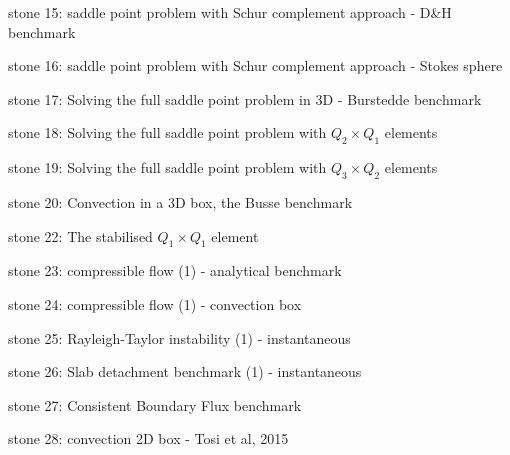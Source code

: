 {\noindent stone 15: saddle point problem with Schur complement approach - D\&H benchmark 


\noindent stone 16: saddle point problem with Schur complement approach - Stokes sphere 


\noindent stone 17: Solving the full saddle point problem in 3D - Burstedde benchmark \cite{dobo04} 


\noindent stone 18: Solving the full saddle point problem with $Q_2\times Q_1$ elements 


\noindent stone 19: Solving the full saddle point problem with $Q_3\times Q_2$ elements 


\noindent stone 20: Convection in a 3D box, the Busse benchmark \cite{bucc93}


\noindent stone 22: The stabilised $Q_1 \times Q_1$ element 


\noindent stone 23: compressible flow (1) - analytical benchmark 


\noindent stone 24: compressible flow (1) - convection box 


\noindent stone 25: Rayleigh-Taylor instability (1) - instantaneous \cite{vaks97}


\noindent stone 26: Slab detachment benchmark (1) - instantaneous 


\noindent stone 27: Consistent Boundary Flux benchmark


\noindent stone 28: convection 2D box - Tosi et al, 2015


}
